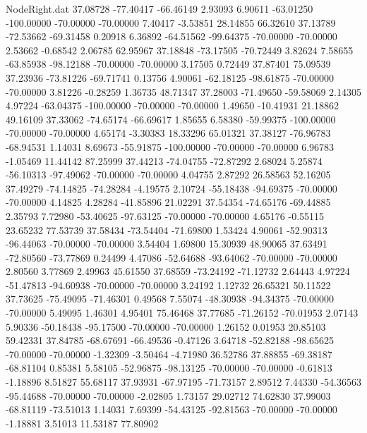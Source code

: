 \begin{filecontents}{NodeRight.dat}
  37.08728  -77.40417  -66.46149     2.93093    6.90611  -63.01250 -100.00000  -70.00000  -70.00000    7.40417   -3.53851   28.14855   66.32610
  37.13789  -72.53662  -69.31458     0.20918    6.36892  -64.51562  -99.64375  -70.00000  -70.00000    2.53662   -0.68542    2.06785   62.95967
  37.18848  -73.17505  -70.72449     3.82624    7.58655  -63.85938  -98.12188  -70.00000  -70.00000    3.17505    0.72449   37.87401   75.09539
  37.23936  -73.81226  -69.71741     0.13756    4.90061  -62.18125  -98.61875  -70.00000  -70.00000    3.81226   -0.28259    1.36735   48.71347
  37.28003  -71.49650  -59.58069     2.14305    4.97224  -63.04375 -100.00000  -70.00000  -70.00000    1.49650  -10.41931   21.18862   49.16109
  37.33062  -74.65174  -66.69617     1.85655    6.58380  -59.99375 -100.00000  -70.00000  -70.00000    4.65174   -3.30383   18.33296   65.01321
  37.38127  -76.96783  -68.94531     1.14031    8.69673  -55.91875 -100.00000  -70.00000  -70.00000    6.96783   -1.05469   11.44142   87.25999
  37.44213  -74.04755  -72.87292     2.68024    5.25874  -56.10313  -97.49062  -70.00000  -70.00000    4.04755    2.87292   26.58563   52.16205
  37.49279  -74.14825  -74.28284    -4.19575    2.10724  -55.18438  -94.69375  -70.00000  -70.00000    4.14825    4.28284  -41.85896   21.02291
  37.54354  -74.65176  -69.44885     2.35793    7.72980  -53.40625  -97.63125  -70.00000  -70.00000    4.65176   -0.55115   23.65232   77.53739
  37.58434  -73.54404  -71.69800     1.53424    4.90061  -52.90313  -96.44063  -70.00000  -70.00000    3.54404    1.69800   15.30939   48.90065
  37.63491  -72.80560  -73.77869     0.24499    4.47086  -52.64688  -93.64062  -70.00000  -70.00000    2.80560    3.77869    2.49963   45.61550
  37.68559  -73.24192  -71.12732     2.64443    4.97224  -51.47813  -94.60938  -70.00000  -70.00000    3.24192    1.12732   26.65321   50.11522
  37.73625  -75.49095  -71.46301     0.49568    7.55074  -48.30938  -94.34375  -70.00000  -70.00000    5.49095    1.46301    4.95401   75.46468
  37.77685  -71.26152  -70.01953     2.07143    5.90336  -50.18438  -95.17500  -70.00000  -70.00000    1.26152    0.01953   20.85103   59.42331
  37.84785  -68.67691  -66.49536    -0.47126    3.64718  -52.82188  -98.65625  -70.00000  -70.00000   -1.32309   -3.50464   -4.71980   36.52786
  37.88855  -69.38187  -68.81104     0.85381    5.58105  -52.96875  -98.13125  -70.00000  -70.00000   -0.61813   -1.18896    8.51827   55.68117
  37.93931  -67.97195  -71.73157     2.89512    7.44330  -54.36563  -95.44688  -70.00000  -70.00000   -2.02805    1.73157   29.02712   74.62830
  37.99003  -68.81119  -73.51013     1.14031    7.69399  -54.43125  -92.81563  -70.00000  -70.00000   -1.18881    3.51013   11.53187   77.80902

\end{filecontents}
